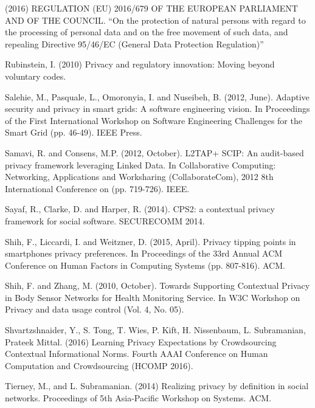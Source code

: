 \documentclass[../thesis.tex]{subfiles}
\begin{document}
\bigskip

(2016) REGULATION (EU) 2016/679 OF THE EUROPEAN PARLIAMENT AND OF THE
COUNCIL. ``On the protection of natural persons with
regard to the processing of personal data and on the free movement of
such data, and repealing Directive 95/46/EC (General Data Protection
Regulation)''


\bigskip

\textcolor[rgb]{0.13333334,0.13333334,0.13333334}{Rubinstein, I. (2010)
{\textquotedbl}Privacy and regulatory innovation: Moving beyond
voluntary codes.{\textquotedbl}}


\bigskip

Salehie, M., Pasquale, L., Omoronyia, I. and Nuseibeh, B. (2012, June).
Adaptive security and privacy in smart grids: A software engineering
vision. In Proceedings of the First International Workshop on Software
Engineering Challenges for the Smart Grid (pp. 46-49). IEEE Press.


\bigskip

Samavi, R. and Consens, M.P. (2012, October). L2TAP+ SCIP: An
audit-based privacy framework leveraging Linked Data. In Collaborative
Computing: Networking, Applications and Worksharing (CollaborateCom),
2012 8th International Conference on (pp. 719-726). IEEE.


\bigskip

Sayaf, R., Clarke, D. and Harper, R. (2014). CPS2: a contextual privacy
framework for social software. SECURECOMM 2014.


\bigskip

Shih, F., Liccardi, I. and Weitzner, D. (2015, April). Privacy tipping
points in smartphones privacy preferences. In Proceedings of the 33rd
Annual ACM Conference on Human Factors in Computing Systems (pp.
807-816). ACM.


\bigskip

Shih, F. and Zhang, M. (2010, October). Towards Supporting Contextual
Privacy in Body Sensor Networks for Health Monitoring Service. In W3C
Workshop on Privacy and data usage control (Vol. 4, No. 05).


\bigskip

Shvartzshnaider, Y., S. Tong, T. Wies, P. Kift, H. Nissenbaum, L.
Subramanian, Prateek Mittal. (2016) Learning Privacy Expectations by
Crowdsourcing Contextual Informational Norms. Fourth AAAI Conference on
Human Computation and Crowdsourcing (HCOMP 2016).


\bigskip

Tierney, M., and L. Subramanian. (2014) {\textquotedbl}Realizing privacy
by definition in social networks.{\textquotedbl} Proceedings of 5th
Asia-Pacific Workshop on Systems. ACM.
\end{document}
